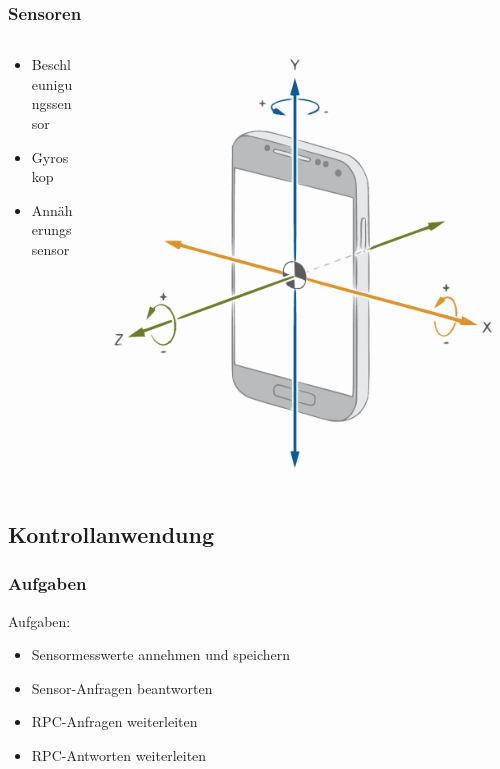 \documentclass{beamer}
\begin{document}
\begin{frame}
    \frametitle[]{Sensoren}
    \begin{columns}
        \begin{column}{0.5\textwidth}
            \begin{itemize}
                \item Beschleunigungssensor
                \item Gyroskop
                \item Annäherungssensor
            \end{itemize}
        \end{column}
        \begin{column}[]{0.5\textwidth}
            \includegraphics[width=\textwidth]{images/android_axes.pdf}
        \end{column}
    \end{columns}
\end{frame}


\subsection{Kontrollanwendung}
\begin{frame}
    \frametitle[]{Aufgaben}
    Aufgaben:
    \begin{itemize}
        \item Sensormesswerte annehmen und speichern
        \item Sensor-Anfragen beantworten
        \item RPC-Anfragen weiterleiten
        \item RPC-Antworten weiterleiten
    \end{itemize}
\end{frame}
\end{document}

